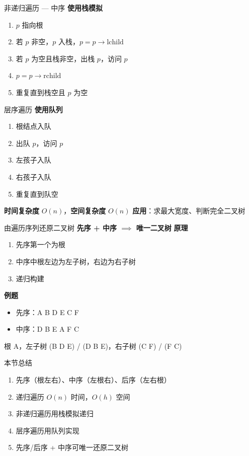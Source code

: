 \documentclass[10pt, aspectratio=169]{beamer}
\begin{document}
\begin{frame}{非递归遍历 --- 中序}
    \textbf{使用栈模拟}
    \vspace{0.3em}
    \begin{enumerate}
        \item $p$ 指向根
        \item 若 $p$ 非空，$p$ 入栈，$p = p \to \text{lchild}$
        \item 若 $p$ 为空且栈非空，出栈 $p$，访问 $p$
        \item $p = p \to \text{rchild}$
        \item 重复直到栈空且 $p$ 为空
    \end{enumerate}
\end{frame}

\begin{frame}{层序遍历}
    \textbf{使用队列}
    \vspace{0.3em}
    \begin{enumerate}
        \item 根结点入队
        \item 出队 $p$，访问 $p$
        \item 左孩子入队
        \item 右孩子入队
        \item 重复直到队空
    \end{enumerate}
    \vspace{0.5em}
    \textbf{时间复杂度} $O(n)$，\textbf{空间复杂度} $O(n)$
    \vspace{0.3em}
    \textbf{应用}：求最大宽度、判断完全二叉树
\end{frame}

\begin{frame}{由遍历序列还原二叉树}
    \textbf{先序 + 中序 $\implies$ 唯一二叉树}
    \vspace{0.3em}
    \textbf{原理}
    \begin{enumerate}
        \item 先序第一个为根
        \item 中序中根左边为左子树，右边为右子树
        \item 递归构建
    \end{enumerate}
    \vspace{0.3em}
    \textbf{例题}
    \begin{itemize}
        \item 先序：A B D E C F
        \item 中序：D B E A F C
    \end{itemize}
    根 A，左子树 (B D E) / (D B E)，右子树 (C F) / (F C)
\end{frame}

\begin{frame}{本节总结}
    \begin{enumerate}
        \item 先序（根左右）、中序（左根右）、后序（左右根）
        \item 递归遍历 $O(n)$ 时间，$O(h)$ 空间
        \item 非递归遍历用栈模拟递归
        \item 层序遍历用队列实现
        \item 先序/后序 + 中序可唯一还原二叉树
    \end{enumerate}
\end{frame}
\end{document}
